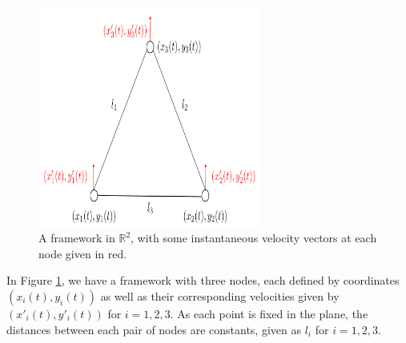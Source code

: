 \begin{figure}[htbp]
    \centering
    \includegraphics[width = 0.65\textwidth]{Chapter 2/13. inf_rigid_proof.png}
    \caption{A framework in $\mathbb{R}^2$, with some instantaneous velocity vectors at each node given in red.}
    \label{fig: inf_velocity}
\end{figure}

\vspace{-3mm}
\begin{flushleft}
In Figure \ref{fig: inf_velocity}, we have a framework with three nodes, each defined by coordinates $(x_i(t), y_i(t))$ as well as their corresponding velocities given by $(x'_i(t), y'_i(t))$ for $i = 1,2,3$. As each point is fixed in the plane, the distances between each pair of nodes are constants, given as $l_i$ for $i = 1,2,3$.
\end{flushleft}

